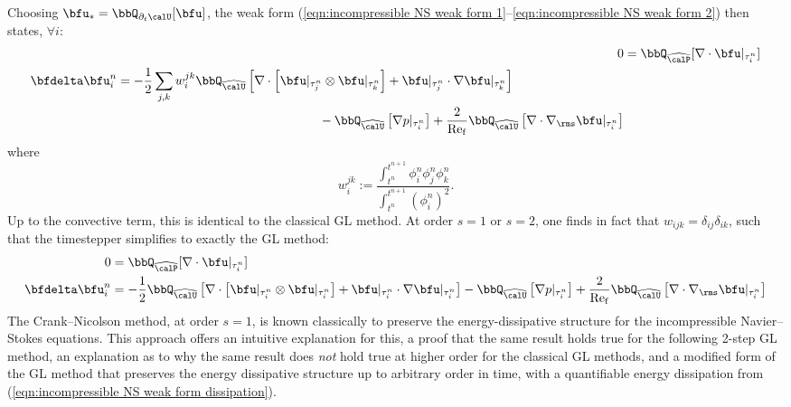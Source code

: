 \begin{example}
        Choosing $\bfu_{*} = \bbQ_{\partial_{t}\calU}[\bfu]$, the weak form (\ref{eqn:incompressible NS weak form 1}--\ref{eqn:incompressible NS weak form 2}) then states, $\forall i$:
        \begin{align}
                                                                                0  &=  \bbQ_{\widehat{\calP}}[\nabla\cdot\bfu|_{\tau^{n}_{i}}]  \\
            \begin{split}
                \bfdelta\bfu^{n}_{i}  &=  - \frac{1}{2}\sum_{j, k}w_{i}^{jk}\bbQ_{\widehat{\calU}}\left[\nabla\cdot\left[\bfu|_{\tau^{n}_{j}}\otimes\bfu|_{\tau^{n}_{k}}\right] + \bfu|_{\tau^{n}_{j}}\cdot\nabla\bfu|_{\tau^{n}_{k}}\right]  \\
                                      &\qquad\qquad\qquad\qquad\qquad\qquad\qquad\qquad- \bbQ_{\widehat{\calU}}\left[\nabla p|_{\tau^{n}_{i}}\right] + \frac{2}{\rmRef}\bbQ_{\widehat{\calU}}\left[\nabla\cdot\nabla_{\rms}\bfu|_{\tau^{n}_{i}}\right]
            \end{split}
        \end{align}
        where
        \begin{equation}\label{eqn:w_i^jk definition}
            w_{i}^{jk}  :=  \frac{\int_{t^{n}}^{t^{n + 1}}\phi^{n}_{i}\phi^{n}_{j}\phi^{n}_{k}}{\int_{t^{n}}^{t^{n + 1}}(\phi^{n}_{i})^{2}}.
        \end{equation}
        Up to the convective term, this is identical to the classical GL method. At order $s = 1$ or $s = 2$, one finds in fact that $w_{ijk} = \delta_{ij}\delta_{ik}$, such that the timestepper simplifies to exactly the GL method:
        \begin{align}
                               0  &=  \bbQ_{\widehat{\calP}}[\nabla\cdot\bfu|_{\tau^{n}_{i}}]  \\
            \bfdelta\bfu^{n}_{i}  &=  - \frac{1}{2}\bbQ_{\widehat{\calU}}\left[\nabla\cdot\left[\bfu|_{\tau^{n}_{i}}\otimes\bfu|_{\tau^{n}_{i}}\right] + \bfu|_{\tau^{n}_{i}}\cdot\nabla\bfu|_{\tau^{n}_{i}}\right] - \bbQ_{\widehat{\calU}}\left[\nabla p|_{\tau^{n}_{i}}\right] + \frac{2}{\rmRef}\bbQ_{\widehat{\calU}}\left[\nabla\cdot\nabla_{\rms}\bfu|_{\tau^{n}_{i}}\right]
        \end{align}
        The Crank--Nicolson method, at order $s = 1$, is known classically to preserve the energy-dissipative structure for the incompressible Navier--Stokes equations. This approach offers an intuitive explanation for this, a proof that the same result holds true for the following 2-step GL method, an explanation as to why the same result does \emph{not} hold true at higher order for the classical GL methods, and a modified form of the GL method that preserves the energy dissipative structure up to arbitrary order in time, with a quantifiable energy dissipation from (\ref{eqn:incompressible NS weak form dissipation}).
        

\end{example}
